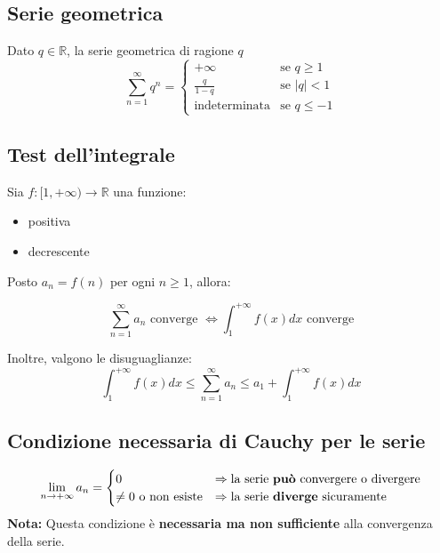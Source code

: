 \documentclass[12pt, a4paper]{article}
\begin{document}
    \subsection{Serie geometrica}
        Dato $q\in\mathbb{R}$, la serie geometrica di ragione $q$ 
        \begin{equation*}
            \sum_{n=1}^{\infty}q^n = \begin{cases}
                +\infty & \text{se } q\geq 1\\
                \frac{q}{1-q} & \text{se } |q|< 1\\
                \text{indeterminata} & \text{se }q\leq -1
            \end{cases}
        \end{equation*}
        \subsection{Test dell'integrale}
            Sia $ f: [1, +\infty) \to \mathbb{R} $ una funzione:
            \begin{itemize}
                \item positiva
                \item decrescente
            \end{itemize}

            Posto $a_n = f(n)$ per ogni $n \geq 1$, allora:

            \begin{equation*}
                \sum_{n=1}^{\infty} a_n \text{ converge } \iff \int_{1}^{+\infty} f(x)dx \text{ converge}
            \end{equation*}

            Inoltre, valgono le disuguaglianze:
            \begin{equation*}
                \int_{1}^{+\infty} f(x)dx \leq \sum_{n=1}^{\infty} a_n \leq a_1 + \int_{1}^{+\infty} f(x)dx
            \end{equation*}
    \subsection{Condizione necessaria di Cauchy per le serie}
        \begin{equation*}
            \lim_{n\rightarrow+\infty}a_n = \begin{cases}
                0 & \Rightarrow \text{la serie \textbf{può} convergere o divergere} \\
                \neq 0 \text{ o non esiste} & \Rightarrow \text{la serie \textbf{diverge} sicuramente}
            \end{cases}
        \end{equation*}
        \textbf{Nota: } Questa condizione è \textbf{necessaria ma non sufficiente} alla convergenza della serie.
\end{document}
